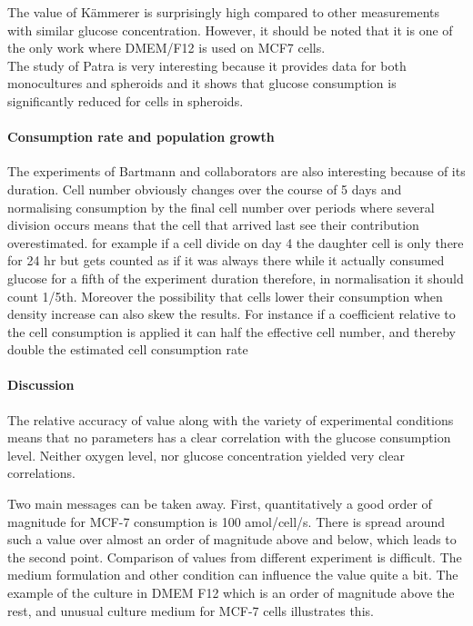 \documentclass[11pt,a4paper]{article}
\begin{document}
The value of Kämmerer is surprisingly high compared to other measurements with similar glucose concentration. However, it should be noted that it is one of the only work where DMEM/F12 is used on MCF7 cells.\\

The study of Patra is very interesting because it provides data for both monocultures and spheroids and it shows that glucose consumption is significantly reduced for cells in spheroids.\\

\paragraph{Consumption rate and population growth}
The experiments of Bartmann and collaborators are also interesting because of its duration. Cell number obviously changes over the course of  5 days and normalising consumption by the final cell number over periods where several division occurs means that the cell that arrived last see their contribution overestimated. for example if a cell divide on day 4 the daughter cell is only there for 24 hr but gets counted as if it was always there while it actually consumed glucose for a fifth of the experiment duration therefore, in normalisation it should count 1/5th. Moreover the possibility that cells lower their consumption when density increase can also skew the results. For instance if a coefficient relative to the cell consumption is applied it can half the effective cell  number, and thereby double the estimated cell consumption rate 

\paragraph{Discussion}
The relative accuracy of value along with the variety of experimental conditions means that no parameters has a clear correlation with the glucose consumption level. Neither oxygen level, nor glucose concentration yielded very clear correlations.

Two main messages can be taken away. First, quantitatively a good order of magnitude for MCF-7 consumption is 100 amol/cell/s. There is spread around such a value over almost an order of magnitude above and below, which leads to the second point. Comparison of values from different experiment is difficult. The medium formulation and other condition can influence the value quite a bit. The example of the culture in DMEM F12 which is an order of magnitude above the rest, and unusual culture medium for MCF-7 cells illustrates this. 
\end{document}
